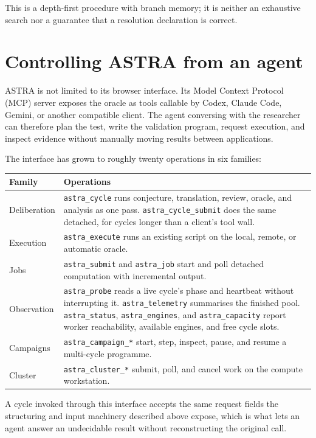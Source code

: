 \documentclass[11pt,a4paper]{article}
\begin{document}
This is a depth-first procedure with branch memory; it is neither an exhaustive search nor a guarantee that a resolution declaration is correct.

\section{Controlling ASTRA from an agent}

ASTRA is not limited to its browser interface. Its Model Context Protocol (MCP) server exposes the oracle as tools callable by Codex, Claude Code, Gemini, or another compatible client. The agent conversing with the researcher can therefore plan the test, write the validation program, request execution, and inspect evidence without manually moving results between applications.

The interface has grown to roughly twenty operations in six families:

\begin{center}
\small
\begin{tabular}{@{}lp{10.0cm}@{}}
\toprule
Family & Operations \\
\midrule
Deliberation & \texttt{astra\_cycle} runs conjecture, translation, review, oracle, and analysis as one pass. \texttt{astra\_cycle\_submit} does the same detached, for cycles longer than a client's tool wall. \\
Execution & \texttt{astra\_execute} runs an existing script on the local, remote, or automatic oracle. \\
Jobs & \texttt{astra\_submit} and \texttt{astra\_job} start and poll detached computation with incremental output. \\
Observation & \texttt{astra\_probe} reads a live cycle's phase and heartbeat without interrupting it. \texttt{astra\_telemetry} summarises the finished pool. \texttt{astra\_status}, \texttt{astra\_engines}, and \texttt{astra\_capacity} report worker reachability, available engines, and free cycle slots. \\
Campaigns & \texttt{astra\_campaign\_*} start, step, inspect, pause, and resume a multi-cycle programme. \\
Cluster & \texttt{astra\_cluster\_*} submit, poll, and cancel work on the compute workstation. \\
\bottomrule
\end{tabular}
\end{center}

A cycle invoked through this interface accepts the same request fields the structuring and input machinery described above expose, which is what lets an agent answer an undecidable result without reconstructing the original call.
\end{document}
